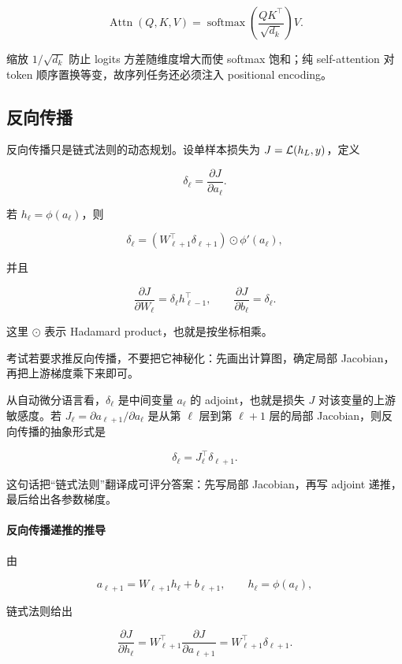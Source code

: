 \[
  \operatorname{Attn}(Q,K,V)=\operatorname{softmax}\!\left(\frac{QK^\top}{\sqrt{d_k}}\right)V.
\]

缩放 \(1/\sqrt{d_k}\) 防止 logits 方差随维度增大而使 softmax 饱和；纯 self-attention 对 token 顺序置换等变，故序列任务还必须注入 positional encoding。

\subsection{反向传播}


反向传播只是链式法则的动态规划。设单样本损失为 \(J=\mathcal{L}(h_L,y)\)，定义

\[
  \delta_\ell=\frac{\partial J}{\partial a_\ell}.
\]

若 \(h_\ell=\phi(a_\ell)\)，则

\[
  \delta_\ell
  =
  (W_{\ell+1}^\top \delta_{\ell+1})
  \odot
  \phi'(a_\ell),
\]

并且

\[
  \frac{\partial J}{\partial W_\ell}
  =
  \delta_\ell h_{\ell-1}^\top,
  \qquad
  \frac{\partial J}{\partial b_\ell}
  =
  \delta_\ell.
\]

这里 \(\odot\) 表示 Hadamard product，也就是按坐标相乘。

考试若要求推反向传播，不要把它神秘化：先画出计算图，确定局部 Jacobian，再把上游梯度乘下来即可。

从自动微分语言看，\(\delta_\ell\) 是中间变量 \(a_\ell\) 的 adjoint，也就是损失 \(J\) 对该变量的上游敏感度。若 \(J_\ell=\partial a_{\ell+1}/\partial a_\ell\) 是从第 \(\ell\) 层到第 \(\ell+1\) 层的局部 Jacobian，则反向传播的抽象形式是

\[
  \delta_\ell
  =
  J_\ell^\top \delta_{\ell+1}.
\]

这句话把“链式法则”翻译成可评分答案：先写局部 Jacobian，再写 adjoint 递推，最后给出各参数梯度。

\paragraph{反向传播递推的推导}

由

\[
  a_{\ell+1}=W_{\ell+1}h_\ell+b_{\ell+1},
  \qquad
  h_\ell=\phi(a_\ell),
\]

链式法则给出

\[
  \frac{\partial J}{\partial h_\ell}
  =
  W_{\ell+1}^\top
  \frac{\partial J}{\partial a_{\ell+1}}
  =
  W_{\ell+1}^\top\delta_{\ell+1}.
\]

